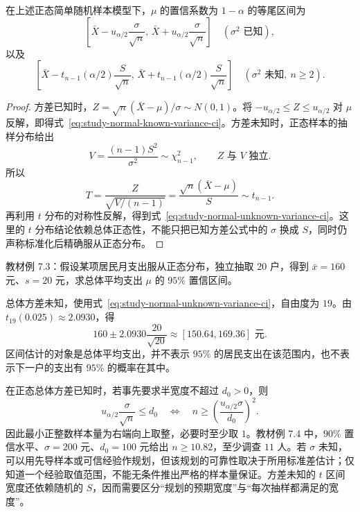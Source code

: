 \begin{theorem}
\label{thm:study-normal-mean-intervals}
在上述正态简单随机样本模型下，$\mu$ 的置信系数为 $1-\alpha$ 的等尾区间为
\begin{equation}
  \left[\bar X-u_{\alpha/2}\frac\sigma{\sqrt n},\,
        \bar X+u_{\alpha/2}\frac\sigma{\sqrt n}\right]
  \quad(\sigma^2\text{ 已知}),
  \label{eq:study-normal-known-variance-ci}
\end{equation}
以及
\begin{equation}
  \left[\bar X-t_{n-1}(\alpha/2)\frac S{\sqrt n},\,
        \bar X+t_{n-1}(\alpha/2)\frac S{\sqrt n}\right]
  \quad(\sigma^2\text{ 未知},\ n\ge2).
  \label{eq:study-normal-unknown-variance-ci}
\end{equation}
\end{theorem}
\begin{proof}
方差已知时，$Z=\sqrt n(\bar X-\mu)/\sigma\sim N(0,1)$。将 $-u_{\alpha/2}\le Z\le u_{\alpha/2}$ 对 $\mu$ 反解，即得式~\eqref{eq:study-normal-known-variance-ci}。方差未知时，正态样本的抽样分布给出
\[
  V=\frac{(n-1)S^2}{\sigma^2}\sim\chi_{n-1}^2,
  \qquad Z\text{ 与 }V\text{ 独立}.
\]
所以
\[
  T=\frac{Z}{\sqrt{V/(n-1)}}
   =\frac{\sqrt n(\bar X-\mu)}S\sim t_{n-1}.
\]
再利用 $t$ 分布的对称性反解，得到式~\eqref{eq:study-normal-unknown-variance-ci}。这里的 $t$ 分布结论依赖总体正态性，不能只把已知方差公式中的 $\sigma$ 换成 $S$，同时仍声称标准化后精确服从正态分布。
\end{proof}

\begin{example}
\label{ex:study-normal-mean-residents}
教材例 7.3：假设某项居民月支出服从正态分布，独立抽取 $20$ 户，得到 $\bar x=160$ 元、$s=20$ 元，求总体平均支出 $\mu$ 的 $95\%$ 置信区间。
\end{example}
\begin{solve}
总体方差未知，使用式~\eqref{eq:study-normal-unknown-variance-ci}，自由度为 $19$。由 $t_{19}(0.025)\approx2.0930$，得
\[
  160\pm2.0930\frac{20}{\sqrt{20}}
  \approx[150.64,169.36]\text{ 元}.
\]
区间估计的对象是总体平均支出，并不表示 $95\%$ 的居民支出在该范围内，也不表示下一户的支出有 $95\%$ 的概率在其中。
\end{solve}

在正态总体方差已知时，若事先要求半宽度不超过 $d_0>0$，则
\begin{equation}
  u_{\alpha/2}\frac\sigma{\sqrt n}\le d_0
  \quad\Longleftrightarrow\quad
  n\ge\left(\frac{u_{\alpha/2}\sigma}{d_0}\right)^2.
  \label{eq:study-normal-ci-sample-size}
\end{equation}
因此最小正整数样本量为右端向上取整，必要时至少取 $1$。教材例 7.4 中，$90\%$ 置信水平、$\sigma=200$ 元、$d_0=100$ 元给出 $n\ge10.82$，至少调查 $11$ 人。若 $\sigma$ 未知，可以用先导样本或可信经验作规划，但该规划的可靠性取决于所用标准差估计；仅知道一个经验取值范围，不能无条件推出严格的样本量保证。方差未知的 $t$ 区间宽度还依赖随机的 $S$，因而需要区分“规划的预期宽度”与“每次抽样都满足的宽度”。

